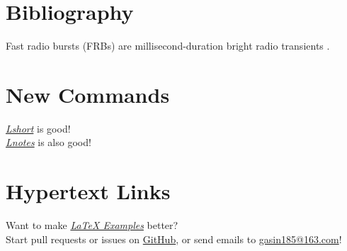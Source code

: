 \documentclass[a4paper,10pt]{article}
\begin{document}
    \section{Bibliography}
    Fast radio bursts (FRBs) are millisecond-duration bright radio transients
    \cite{Li2018,Lin2020}.
    
    
    \section{New Commands}
    \def\lshortURL{https://www.ctan.org/pkg/lshort}
    \def\lnotesURL{https://github.com/huangxg/lnotes}
    \newcommand{\isgood}[3][good]{\href{#3}{\emph{#2}} is #1!}
    \isgood{Lshort}{\lshortURL}\\
    \isgood[also good]{Lnotes}{\lnotesURL}
    \section{Hypertext Links}
    Want to make \href{lexample.pdf}{\emph{\LaTeX{} Examples}} better?\\
    Start pull requests or issues on
    \href{https://github.com/GasinAn/lexamples}{GitHub}, or send emails to
    \href{mailto:gasin185@163.com}{gasin185@163.com}!
\end{document}
